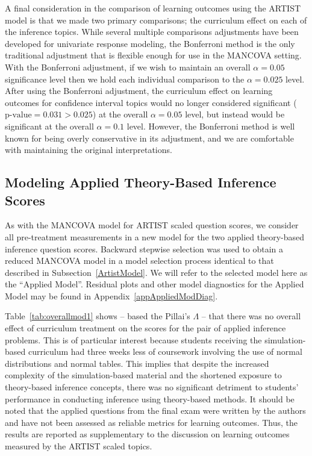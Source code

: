 \documentclass[11pt]{isuthesis}\usepackage[]{graphicx}\usepackage[]{color}
\begin{document}
A final consideration in the comparison of learning outcomes using the ARTIST model is that we made two primary comparisons; the curriculum effect on each of the inference topics. While several multiple comparisons adjustments have been developed for univariate response modeling, the Bonferroni method is the only traditional adjustment that is flexible enough for use in the MANCOVA setting. With the Bonferroni adjustment, if we wish to maintain an overall $\alpha=0.05$ significance level then we hold each individual comparison to the $\alpha=0.025$ level. After using the Bonferroni adjustment, the curriculum effect on learning outcomes for confidence interval topics would no longer considered significant ($\text{p-value} = 0.031 > 0.025$) at the overall $\alpha = 0.05$ level, but instead would be significant at the overall $\alpha = 0.1$ level.  However, the Bonferroni method is well known for being overly conservative in its adjustment, and we are comfortable with maintaining the original interpretations.

\subsection{Modeling Applied Theory-Based Inference Scores}
\label{AppliedModel}

As with the MANCOVA model for ARTIST scaled question scores, we consider all pre-treatment measurements in a new model for the two applied theory-based inference question scores.  Backward stepwise selection was used to obtain a reduced MANCOVA model in a model selection process identical to that described in Subsection~\ref{ArtistModel}. We will refer to the selected model here as the ``Applied Model''.  Residual plots and other model diagnostics for the Applied Model may be found in Appendix~\ref{appAppliedModDiag}.

Table~\ref{tab:overallmod1} shows -- based the Pillai's $\Lambda$ -- that there was no overall effect of curriculum treatment on the scores for the pair of applied inference problems. This is of particular interest because students receiving the simulation-based curriculum had three weeks less of coursework involving the use of normal distributions and normal tables. This implies that despite the increased complexity of the simulation-based material and the shortened exposure to theory-based inference concepts, there was no significant detriment to students' performance in conducting inference using theory-based methods. It should be noted that the applied questions from the final exam were written by the authors and have not been assessed as reliable metrics for learning outcomes. Thus, the results are reported as supplementary to the discussion on learning outcomes measured by the ARTIST scaled topics.
\end{document}

